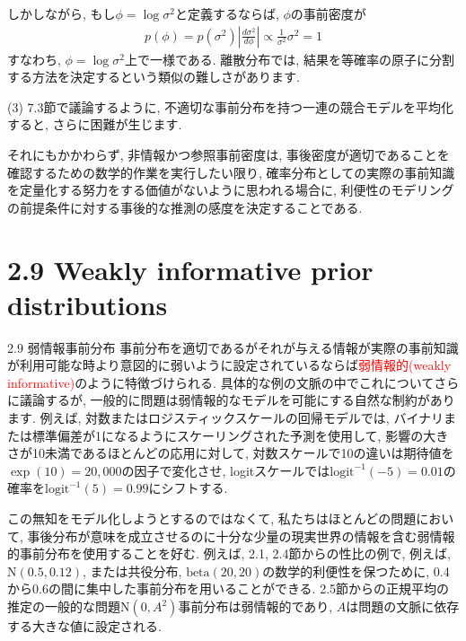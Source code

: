 \documentclass[10pt,dvipdfmx,a4]{beamer}
\newcommand{\eqn}[1]{\begin{align*}#1\end{align*}}
\newcommand{\tcr}[1]{\textcolor{red}{#1}}
\begin{document}
\begin{frame}
しかしながら, もし$\phi=\log \sigma^2$と定義するならば, $\phi$の事前密度が
\eqn{p(\phi)=p(\sigma^2)\left| \frac{d\sigma^2}{d\phi}\right| \propto \frac{1}{\sigma^2}\sigma^2=1}
すなわち, $\phi=\log \sigma^2$上で一様である.
離散分布では, 結果を等確率の原子に分割する方法を決定するという類似の難しさがあります.

(3) 7.3節で議論するように, 不適切な事前分布を持つ一連の競合モデルを平均化すると, さらに困難が生じます.

それにもかかわらず, 非情報かつ参照事前密度は, 事後密度が適切であることを確認するための数学的作業を実行したい限り, 確率分布としての実際の事前知識を定量化する努力をする価値がないように思われる場合に, 利便性のモデリングの前提条件に対する事後的な推測の感度を決定することである.
\end{frame}

\section{2.9 Weakly informative prior distributions}
\begin{frame}{2.9 弱情報事前分布}
事前分布を適切であるがそれが与える情報が実際の事前知識が利用可能な時より意図的に弱いように設定されているならば\tcr{弱情報的(weakly informative)}のように特徴づけられる.
具体的な例の文脈の中でこれについてさらに議論するが, 一般的に問題は弱情報的なモデルを可能にする自然な制約があります.
例えば, 対数またはロジスティックスケールの回帰モデルでは, バイナリまたは標準偏差が1になるようにスケーリングされた予測を使用して, 影響の大きさが10未満であるほとんどの応用に対して, 対数スケールで10の違いは期待値を$\exp(10)= 20,000$の因子で変化させ, logitスケールでは$\text{logit}^{-1}(-5)= 0.01$の確率を$\text{logit}^{-1}(5)= 0.99$にシフトする.

この無知をモデル化しようとするのではなくて, 私たちはほとんどの問題において, 事後分布が意味を成立させるのに十分な少量の現実世界の情報を含む弱情報的事前分布を使用することを好む.
例えば, 2.1, 2.4節からの性比の例で, 例えば, $\text{N}(0.5,0.12)$, または共役分布, $\text{beta}(20,20)$の数学的利便性を保つために, 0.4から0.6の間に集中した事前分布を用いることができる.
2.5節からの正規平均の推定の一般的な問題$\text{N}(0,A^2)$事前分布は弱情報的であり, $A$は問題の文脈に依存する大きな値に設定される.
\end{frame}

\end{document}
